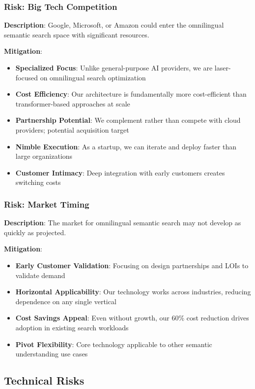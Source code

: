 \subsubsection{Risk: Big Tech Competition}
\textbf{Description}: Google, Microsoft, or Amazon could enter the omnilingual semantic search space with significant resources.

\textbf{Mitigation}:
\begin{itemize}
    \item \textbf{Specialized Focus}: Unlike general-purpose AI providers, we are laser-focused on omnilingual search optimization
    \item \textbf{Cost Efficiency}: Our architecture is fundamentally more cost-efficient than transformer-based approaches at scale
    \item \textbf{Partnership Potential}: We complement rather than compete with cloud providers; potential acquisition target
    \item \textbf{Nimble Execution}: As a startup, we can iterate and deploy faster than large organizations
    \item \textbf{Customer Intimacy}: Deep integration with early customers creates switching costs
\end{itemize}

\subsubsection{Risk: Market Timing}
\textbf{Description}: The market for omnilingual semantic search may not develop as quickly as projected.

\textbf{Mitigation}:
\begin{itemize}
    \item \textbf{Early Customer Validation}: Focusing on design partnerships and LOIs to validate demand
    \item \textbf{Horizontal Applicability}: Our technology works across industries, reducing dependence on any single vertical
    \item \textbf{Cost Savings Appeal}: Even without growth, our 60\% cost reduction drives adoption in existing search workloads
    \item \textbf{Pivot Flexibility}: Core technology applicable to other semantic understanding use cases
\end{itemize}

\subsection{Technical Risks}

